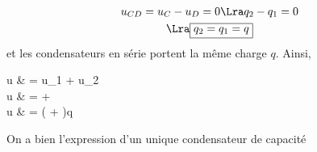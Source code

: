 \documentclass[../../main/main.tex]{subfiles}
\begin{document}
\begin{tcbraster}[raster columns=2, raster equal height=rows]
\begin{tcb*}[label=demo:cserie]
{			\begin{gather*}
				u_{CD} = u_{C} - u_{D} = 0 \Lra q_2 - q_1 = 0
				\\\Lra
				\boxed{q_2 = q_1 = q}
			\end{gather*}
			et les condensateurs en série portent la même charge $q$. Ainsi,
			\begin{DispWithArrows*}
				u & = u_1 + u_2
				\\\Lra
				u & =  + 
				\\\Lra
				u & = \left( + \right)q
			\end{DispWithArrows*}
			On a bien l'expression d'un unique condensateur de capacité
		}%
	\end{tcb*}
\end{tcbraster}
\end{document}
